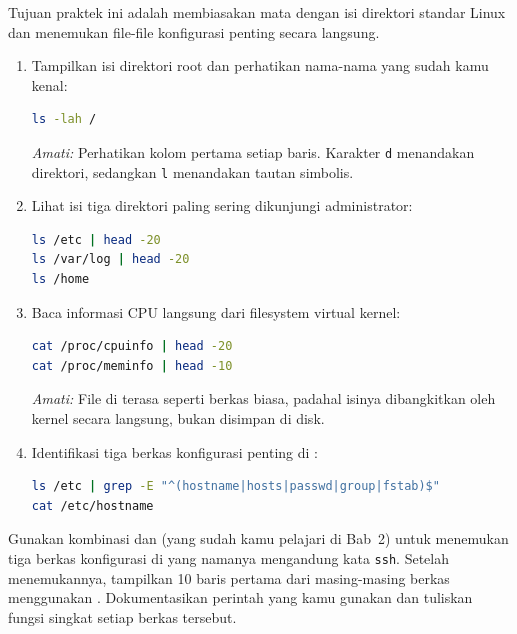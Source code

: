 Tujuan praktek ini adalah membiasakan mata dengan isi direktori standar Linux dan
menemukan file-file konfigurasi penting secara langsung.

\begin{enumerate}
    \item Tampilkan isi direktori root dan perhatikan nama-nama yang sudah kamu kenal:
\begin{lstlisting}[language=bash, caption={Melihat isi root filesystem}]
ls -lah /
\end{lstlisting}
    \textit{Amati:} Perhatikan kolom pertama setiap baris. Karakter \texttt{d} menandakan direktori, sedangkan \texttt{l} menandakan tautan simbolis.

    \item Lihat isi tiga direktori paling sering dikunjungi administrator:
\begin{lstlisting}[language=bash, caption={Menginspeksi /etc, /var/log, dan /home}]
ls /etc | head -20
ls /var/log | head -20
ls /home
\end{lstlisting}

    \item Baca informasi CPU langsung dari filesystem virtual kernel:
\begin{lstlisting}[language=bash, caption={Membaca informasi sistem dari /proc}]
cat /proc/cpuinfo | head -20
cat /proc/meminfo | head -10
\end{lstlisting}
    \textit{Amati:} File di  terasa seperti berkas biasa, padahal isinya dibangkitkan oleh kernel secara langsung, bukan disimpan di disk.

    \item Identifikasi tiga berkas konfigurasi penting di :
\begin{lstlisting}[language=bash, caption={Mencari file konfigurasi penting dengan grep}]
ls /etc | grep -E "^(hostname|hosts|passwd|group|fstab)$"
cat /etc/hostname
\end{lstlisting}
\end{enumerate}

\begin{challengebox}
Gunakan kombinasi  dan  (yang sudah kamu pelajari di Bab~2) untuk menemukan
tiga berkas konfigurasi di  yang namanya mengandung kata \texttt{ssh}. Setelah
menemukannya, tampilkan 10 baris pertama dari masing-masing berkas menggunakan .
Dokumentasikan perintah yang kamu gunakan dan tuliskan fungsi singkat setiap berkas tersebut.
\end{challengebox}

